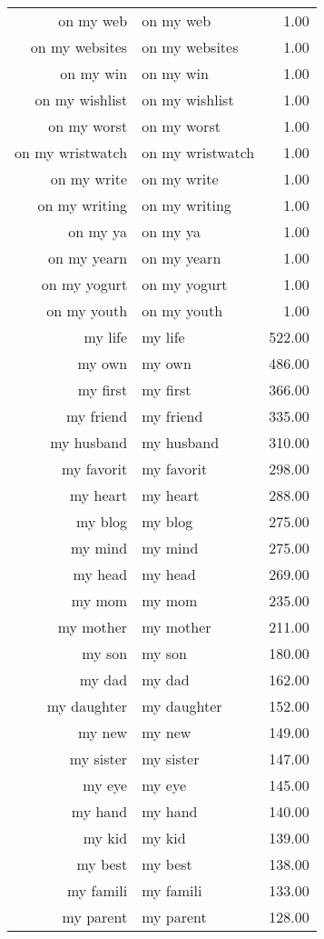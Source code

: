 \begin{table}[ht]
\begin{tabular}{rlr}
  on my web & on my web & 1.00 \\ 
  on my websites & on my websites & 1.00 \\ 
  on my win & on my win & 1.00 \\ 
  on my wishlist & on my wishlist & 1.00 \\ 
  on my worst & on my worst & 1.00 \\ 
  on my wristwatch & on my wristwatch & 1.00 \\ 
  on my write & on my write & 1.00 \\ 
  on my writing & on my writing & 1.00 \\ 
  on my ya & on my ya & 1.00 \\ 
  on my yearn & on my yearn & 1.00 \\ 
  on my yogurt & on my yogurt & 1.00 \\ 
  on my youth & on my youth & 1.00 \\ 
  my life & my life & 522.00 \\ 
  my own & my own & 486.00 \\ 
  my first & my first & 366.00 \\ 
  my friend & my friend & 335.00 \\ 
  my husband & my husband & 310.00 \\ 
  my favorit & my favorit & 298.00 \\ 
  my heart & my heart & 288.00 \\ 
  my blog & my blog & 275.00 \\ 
  my mind & my mind & 275.00 \\ 
  my head & my head & 269.00 \\ 
  my mom & my mom & 235.00 \\ 
  my mother & my mother & 211.00 \\ 
  my son & my son & 180.00 \\ 
  my dad & my dad & 162.00 \\ 
  my daughter & my daughter & 152.00 \\ 
  my new & my new & 149.00 \\ 
  my sister & my sister & 147.00 \\ 
  my eye & my eye & 145.00 \\ 
  my hand & my hand & 140.00 \\ 
  my kid & my kid & 139.00 \\ 
  my best & my best & 138.00 \\ 
  my famili & my famili & 133.00 \\ 
  my parent & my parent & 128.00 \\ 

\end{tabular}
\end{table}

